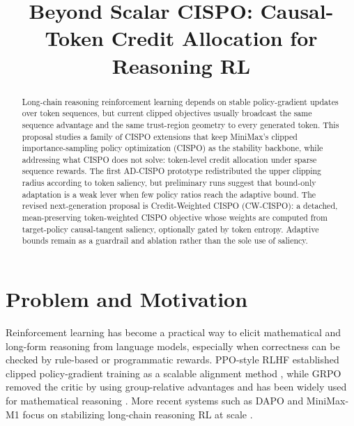 \documentclass[11pt]{article}
\title{Beyond Scalar CISPO: Causal-Token Credit Allocation for Reasoning RL}
\author{}
\date{}
\begin{document}
\maketitle

\begin{abstract}
Long-chain reasoning reinforcement learning depends on stable policy-gradient
updates over token sequences, but current clipped objectives usually broadcast
the same sequence advantage and the same trust-region geometry to every
generated token. This proposal studies a family of CISPO extensions that keep
MiniMax's clipped importance-sampling policy optimization (CISPO) as the
stability backbone, while addressing what CISPO does not solve: token-level
credit allocation under sparse sequence rewards. The first AD-CISPO prototype
redistributed the upper clipping radius according to token saliency, but
preliminary runs suggest that bound-only adaptation is a weak lever when few
policy ratios reach the adaptive bound. The revised next-generation proposal is
Credit-Weighted CISPO (CW-CISPO): a detached, mean-preserving token-weighted
CISPO objective whose weights are computed from target-policy causal-tangent
saliency, optionally gated by token entropy. Adaptive bounds remain as a
guardrail and ablation rather than the sole use of saliency.
\end{abstract}

\section{Problem and Motivation}

Reinforcement learning has become a practical way to elicit mathematical and
long-form reasoning from language models, especially when correctness can be
checked by rule-based or programmatic rewards. PPO-style RLHF established
clipped policy-gradient training as a scalable alignment method
\cite{schulman2017ppo,ouyang2022instructgpt}, while GRPO removed the critic by
using group-relative advantages and has been widely used for mathematical
reasoning \cite{shao2024deepseekmath,deepseek2025r1}. More recent systems such
as DAPO and MiniMax-M1 focus on stabilizing long-chain reasoning RL at scale
\cite{yu2025dapo,minimax2025m1}.
\end{document}
